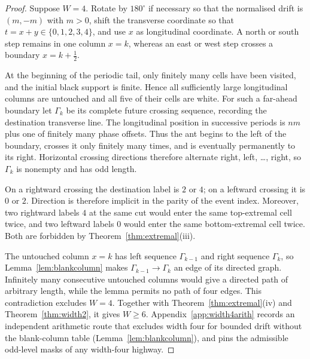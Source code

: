\documentclass[11pt,reqno]{amsart}
\theoremstyle{plain}
\theoremstyle{definition}
\begin{document}
\begin{proof}
Suppose $W=4$.  Rotate by $180^\circ$ if necessary so that the normalised drift is
$(m,-m)$ with $m>0$, shift the transverse coordinate so that
$t=x+y\in\{0,1,2,3,4\}$, and use $x$ as longitudinal coordinate.  A north or south
step remains in one column $x=k$, whereas an east or west step crosses a boundary
$x=k+\tfrac12$.

At the beginning of the periodic tail, only finitely many cells have been visited,
and the initial black support is finite.  Hence all sufficiently large longitudinal
columns are untouched and all five of their cells are white.  For such a far-ahead
boundary let $\Gamma_k$ be its complete future crossing sequence, recording the
destination transverse line.  The longitudinal position in successive periods is
$nm$ plus one of finitely many phase offsets.  Thus the ant begins to the left of the
boundary, crosses it only finitely many times, and is eventually permanently to its
right.  Horizontal crossing directions therefore alternate right, left, \ldots,
right, so $\Gamma_k$ is nonempty and has odd length.

On a rightward crossing the destination label is $2$ or $4$; on a leftward crossing
it is $0$ or $2$.  Direction is therefore implicit in the parity of the event index.
Moreover, two rightward labels $4$ at the same cut would enter the same top-extremal
cell twice, and two leftward labels $0$ would enter the same bottom-extremal cell
twice.  Both are forbidden by Theorem~\ref{thm:extremal}(iii).

The untouched column $x=k$ has left sequence $\Gamma_{k-1}$ and right sequence
$\Gamma_k$, so Lemma~\ref{lem:blankcolumn} makes
$\Gamma_{k-1}\to\Gamma_k$ an edge of its directed graph.  Infinitely many
consecutive untouched columns would give a directed path of arbitrary length, while
the lemma permits no path of four edges.  This contradiction excludes $W=4$.
Together with Theorem~\ref{thm:extremal}(iv) and Theorem~\ref{thm:width2}, it gives
$W\ge6$. Appendix~\ref{app:width4arith} records an independent arithmetic route that
excludes width four for bounded drift without the blank-column table
(Lemma~\ref{lem:blankcolumn}), and pins the admissible odd-level masks of any
width-four highway.
\end{proof}
\end{document}

